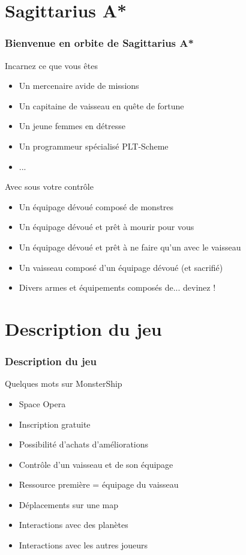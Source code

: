 \documentclass{beamer}
\begin{document}
	\section{Sagittarius A*}
		\begin{frame}
			\frametitle{Bienvenue en orbite de Sagittarius A*}
			\begin{block}{Incarnez ce que vous êtes}
				\begin{itemize}
					\item Un mercenaire avide de missions
					\item Un capitaine de vaisseau en quête de fortune
					\item Un jeune femmes en détresse
					\item Un programmeur spécialisé PLT-Scheme
					\item ...
				\end{itemize}
			\end{block}
			
			\begin{block}{Avec sous votre contrôle}
				\begin{itemize}
					\item Un équipage dévoué composé de monstres
					\item Un équipage dévoué et prêt à mourir pour vous
					\item Un équipage dévoué et prêt à ne faire qu'un avec le vaisseau
					\item Un vaisseau composé d'un équipage dévoué (et sacrifié)
					\item Divers armes et équipements composés de... devinez !
				\end{itemize}
			\end{block}
		\end{frame}
		
	\section{Description du jeu}
		\begin{frame}
			\frametitle{Description du jeu}
			\begin{block}{Quelques mots sur MonsterShip}
				\begin{itemize}
					\item Space Opera
					\item Inscription gratuite
					\item Possibilité d'achats d'améliorations
					\item Contrôle d'un vaisseau et de son équipage
					\item Ressource première = équipage du vaisseau
					\item Déplacements sur une map
					\item Interactions avec des planètes
					\item Interactions avec les autres joueurs
				\end{itemize}
			\end{block}
		\end{frame}
		
\end{document}
